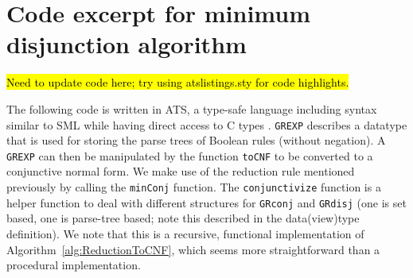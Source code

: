 \section{Code excerpt for minimum disjunction algorithm}
\label{sec:code}

\hl{Need to update code here; try using atslistings.sty for code 
highlights.}

The following code is written in ATS, a type-safe language including
syntax similar to SML while having direct access to C types
\citep{ATStypes03}. \texttt{GREXP} describes a datatype that is used
for storing the parse trees of Boolean rules (without negation).  A
\texttt{GREXP} can then be manipulated by the function \texttt{toCNF}
to be converted to a conjunctive normal form. We make use of the
reduction rule mentioned previously by calling the \texttt{minConj}
function. The \texttt{conjunctivize} function is a helper function to
deal with different structures for \texttt{GRconj} and \texttt{GRdisj}
(one is set based, one is parse-tree based; note this described in the
data(view)type definition). We note that this is a recursive,
functional implementation of Algorithm~\ref{alg:ReductionToCNF}, which
seems more straightforward than a procedural implementation.

